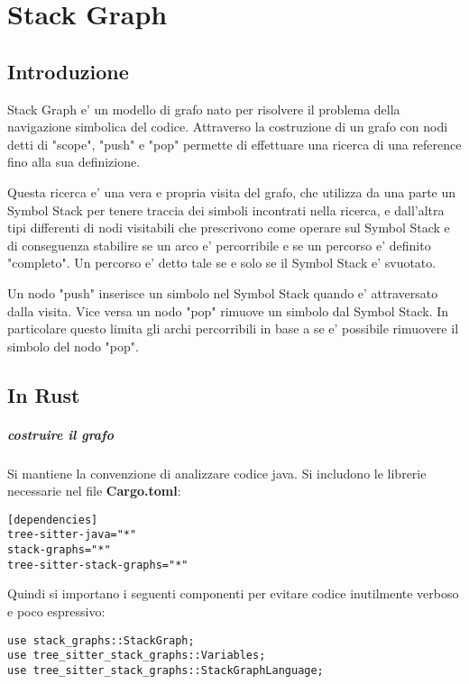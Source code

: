\chapter{Stack Graph}

\section{Introduzione}
Stack Graph e' un modello di grafo nato per risolvere il problema della navigazione simbolica del codice.
Attraverso la costruzione di un grafo con nodi detti di "scope", "push" e "pop" permette di effettuare una ricerca di una reference fino alla sua definizione.

Questa ricerca e' una vera e propria visita del grafo, che utilizza da una parte un Symbol Stack per tenere traccia dei simboli incontrati nella ricerca, e dall'altra tipi differenti di nodi visitabili che prescrivono come operare sul Symbol Stack e di conseguenza stabilire se un arco e' percorribile e se un percorso e' definito "completo".
Un percorso e' detto tale se e solo se il Symbol Stack e' svuotato.

Un nodo "push" inserisce un simbolo nel Symbol Stack quando e' attraversato dalla visita.
Vice versa un nodo "pop" rimuove un simbolo dal Symbol Stack.
In particolare questo limita gli archi percorribili in base a se e' possibile rimuovere il simbolo del nodo "pop".

\section{In Rust}

\paragraph{costruire il grafo}

Si mantiene la convenzione di analizzare codice java.
Si includono le librerie necessarie nel file \textbf{Cargo.toml}:

\begin{Verbatim}[samepage=true]
[dependencies]
tree-sitter-java="*"
stack-graphs="*"
tree-sitter-stack-graphs="*"
\end{Verbatim}

Quindi si importano i seguenti componenti per evitare codice inutilmente verboso e poco espressivo:
\begin{Verbatim}[samepage=true]
use stack_graphs::StackGraph;
use tree_sitter_stack_graphs::Variables; 
use tree_sitter_stack_graphs::StackGraphLanguage; 
\end{Verbatim}

